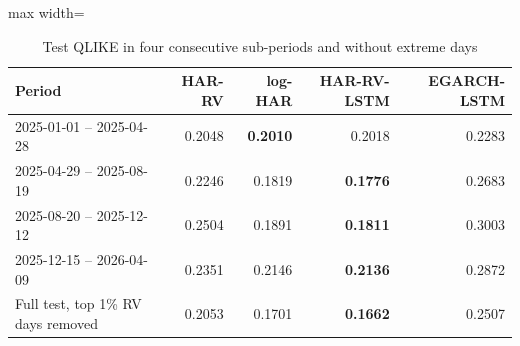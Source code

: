 \begin{table}[htbp]
\centering
\caption{Test QLIKE in four consecutive sub-periods and without extreme days}
\label{tab:subperiods}
\small
\begin{adjustbox}{max width=\textwidth}
\begin{tabular}{lrrrr}
\toprule
Period & HAR-RV & log-HAR & HAR-RV-LSTM & EGARCH-LSTM \\
\midrule
2025-01-01 -- 2025-04-28 & 0.2048 & \textbf{0.2010} & 0.2018 & 0.2283 \\
2025-04-29 -- 2025-08-19 & 0.2246 & 0.1819 & \textbf{0.1776} & 0.2683 \\
2025-08-20 -- 2025-12-12 & 0.2504 & 0.1891 & \textbf{0.1811} & 0.3003 \\
2025-12-15 -- 2026-04-09 & 0.2351 & 0.2146 & \textbf{0.2136} & 0.2872 \\
\midrule
Full test, top 1\% RV days removed & 0.2053 & 0.1701 & \textbf{0.1662} & 0.2507 \\
\bottomrule
\end{tabular}
\end{adjustbox}
\end{table}
